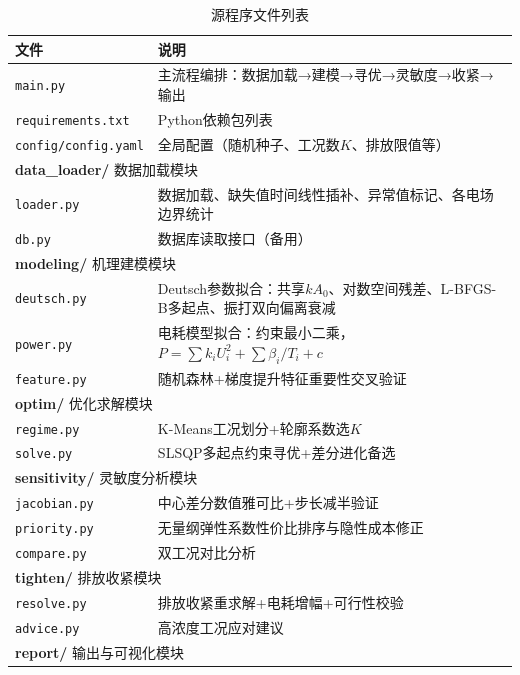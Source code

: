 \begin{table}[H]
  \centering
  \caption{源程序文件列表}
  \label{tab:appendix_code}
  \renewcommand{\arraystretch}{1.05}
  \scriptsize
  \begin{tabularx}{\textwidth}{lX}
    \toprule
    文件 & 说明 \\
    \midrule
    \texttt{main.py} & 主流程编排：数据加载→建模→寻优→灵敏度→收紧→输出 \\
    \texttt{requirements.txt} & Python依赖包列表 \\
    \texttt{config/config.yaml} & 全局配置（随机种子、工况数$K$、排放限值等） \\
    \midrule
    \multicolumn{2}{l}{\textbf{data\_loader/} 数据加载模块} \\
    \texttt{loader.py} & 数据加载、缺失值时间线性插补、异常值标记、各电场边界统计 \\
    \texttt{db.py} & 数据库读取接口（备用） \\
    \midrule
    \multicolumn{2}{l}{\textbf{modeling/} 机理建模模块} \\
    \texttt{deutsch.py} & Deutsch参数拟合：共享$kA_0$、对数空间残差、L-BFGS-B多起点、振打双向偏离衰减 \\
    \texttt{power.py} & 电耗模型拟合：约束最小二乘，$P=\sum k_iU_i^2+\sum\beta_i/T_i+c$ \\
    \texttt{feature.py} & 随机森林+梯度提升特征重要性交叉验证 \\
    \midrule
    \multicolumn{2}{l}{\textbf{optim/} 优化求解模块} \\
    \texttt{regime.py} & K-Means工况划分+轮廓系数选$K$ \\
    \texttt{solve.py} & SLSQP多起点约束寻优+差分进化备选 \\
    \midrule
    \multicolumn{2}{l}{\textbf{sensitivity/} 灵敏度分析模块} \\
    \texttt{jacobian.py} & 中心差分数值雅可比+步长减半验证 \\
    \texttt{priority.py} & 无量纲弹性系数性价比排序与隐性成本修正 \\
    \texttt{compare.py} & 双工况对比分析 \\
    \midrule
    \multicolumn{2}{l}{\textbf{tighten/} 排放收紧模块} \\
    \texttt{resolve.py} & 排放收紧重求解+电耗增幅+可行性校验 \\
    \texttt{advice.py} & 高浓度工况应对建议 \\
    \midrule
    \multicolumn{2}{l}{\textbf{report/} 输出与可视化模块} \\

\end{tabularx}
\end{table}
